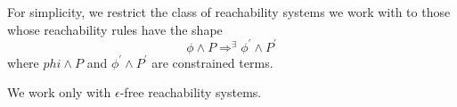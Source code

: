 \begin{remark}\label{rem:shapeOfReachabilityRules}
For simplicity, we restrict the class of reachability systems we work with to those whose reachability rules
have the shape
\begin{equation*}
    \phi \land P \Rightarrow^\exists \phi^\prime \land P^\prime
\end{equation*}
where $phi \land P$ and $\phi^\prime \land P^\prime$ are constrained terms.
\end{remark}

\begin{remark}\label{rem:noEmptySteps}
We work only with $\epsilon$-free reachability systems.
\end{remark}